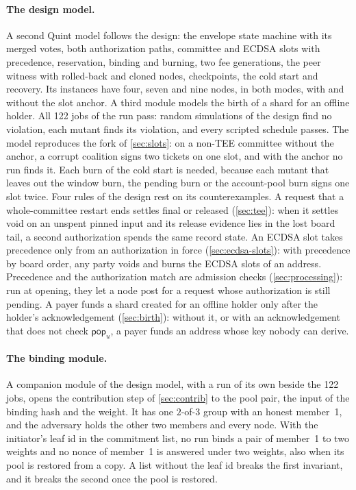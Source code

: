 \paragraph{The design model.} A second Quint model follows the design: the envelope state machine with its merged votes, both authorization paths, committee and ECDSA slots with precedence, reservation, binding and burning, two fee generations, the peer witness with rolled-back and cloned nodes, checkpoints, the cold start and recovery. Its instances have four, seven and nine nodes, in both modes, with and without the slot anchor. A third module models the birth of a shard for an offline holder. All 122 jobs of the run pass: random simulations of the design find no violation, each mutant finds its violation, and every scripted schedule passes. The model reproduces the fork of \cref{sec:slots}: on a non-TEE committee without the anchor, a corrupt coalition signs two tickets on one slot, and with the anchor no run finds it. Each burn of the cold start is needed, because each mutant that leaves out the window burn, the pending burn or the account-pool burn signs one slot twice. Four rules of the design rest on its counterexamples. A request that a whole-committee restart ends settles final or released (\cref{sec:tee}): when it settles void on an unspent pinned input and its release evidence lies in the lost board tail, a second authorization spends the same record state. An ECDSA slot takes precedence only from an authorization in force (\cref{sec:ecdsa-slots}): with precedence by board order, any party voids and burns the ECDSA slots of an address. Precedence and the authorization match are admission checks (\cref{sec:processing}): run at opening, they let a node post  for a request whose authorization is still pending. A payer funds a shard created for an offline holder only after the holder's acknowledgement (\cref{sec:birth}): without it, or with an acknowledgement that does not check $\mathsf{pop}_u$, a payer funds an address whose key nobody can derive.

\paragraph{The binding module.} A companion module of the design model, with a run of its own beside the 122 jobs, opens the contribution step of \cref{sec:contrib} to the pool pair, the input of the binding hash and the weight. It has one $2$-of-$3$ group with an honest member~1, and the adversary holds the other two members and every node. With the initiator's leaf id in the commitment list, no run binds a pair of member~1 to two weights and no nonce of member~1 is answered under two weights, also when its pool is restored from a copy. A list without the leaf id breaks the first invariant, and it breaks the second once the pool is restored.

